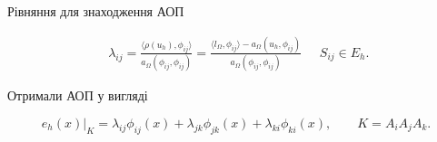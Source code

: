 \newcommand{\error}[1]{\lambda_{#1} \phi_{#1}(x)}

\begin{frame}{Рівняння для знаходження АОП}

	\begin{equation}
		\begin{split}
			\lambda_{ij} = \frac{\langle \rho(u_h), \phi_{ij} \rangle}{a_\Omega(\phi_{ij}, \phi_{ij})}
				= \frac{\langle l_\Omega, \phi_{ij}\rangle - a_\Omega(u_h, \phi_{ij})}{a_\Omega(\phi_{ij}, \phi_{ij})}
		\end{split}
		\quad S_{ij} \in E_h.
	\end{equation}

	Отримали АОП у вигляді

	\begin{equation}\label{eq:AEE_final}
		e_h(x)\bigg|_K = \error{ij}+\error{jk}+\error{ki}, \qquad K = A_iA_jA_k.
	\end{equation}

\end{frame}

